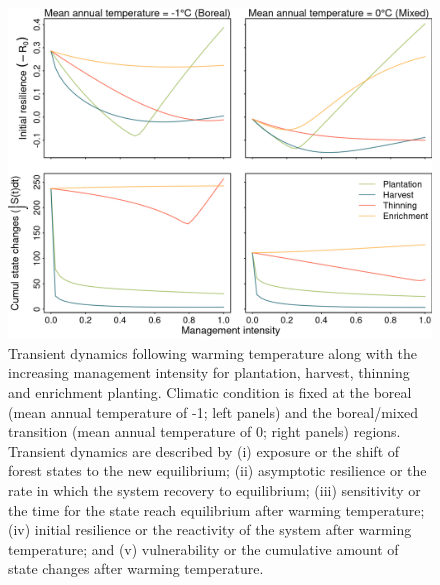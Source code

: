 \hypertarget{fig:sim-result-supp3_ch1}{%
\begin{figure}
\centering
\includegraphics{manuscript/img/num-result_supp1.png}
\caption[{Transient dynamics following warming temperature along with
the increasing management intensity for plantation, harvest, thinning
and enrichment planting.}]{Transient dynamics following warming
temperature along with the increasing management intensity for
plantation, harvest, thinning and enrichment planting. Climatic
condition is fixed at the boreal (mean annual temperature of -1; left
panels) and the boreal/mixed transition (mean annual temperature of 0;
right panels) regions. Transient dynamics are described by (i) exposure
or the shift of forest states to the new equilibrium; (ii) asymptotic
resilience or the rate in which the system recovery to equilibrium;
(iii) sensitivity or the time for the state reach equilibrium after
warming temperature; (iv) initial resilience or the reactivity of the
system after warming temperature; and (v) vulnerability or the
cumulative amount of state changes after warming temperature.}
\label{fig:sim-result-supp3_ch1}
\end{figure}
}

\newpage


